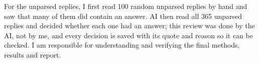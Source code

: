 \documentclass{article}
\begin{document}
For the unparsed replies, I first read 100 random unparsed replies by hand and saw that many of them did contain an answer. AI then read all 365 unparsed replies and decided whether each one had an answer; this review was done by the AI, not by me, and every decision is saved with its quote and reason so it can be checked. I am responsible for understanding and verifying the final methods, results and report.




\appendix
\newpage

\end{document}
